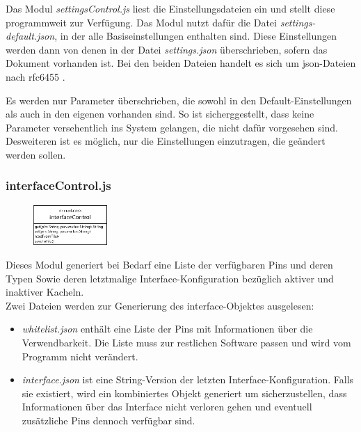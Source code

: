 Das Modul \textit{settingsControl.js} liest die Einstellungsdateien ein und stellt diese programmweit zur Verfügung. Das Modul nutzt dafür die Datei \textit{settings-default.json}, in der alle Basiseinstellungen enthalten sind. Diese Einstellungen werden dann von denen in der Datei \textit{settings.json} überschrieben, sofern das Dokument vorhanden ist. Bei den beiden Dateien handelt es sich um \gls{json}-Dateien nach rfc6455 \cite{rfc6455}.

Es werden nur Parameter überschrieben, die sowohl in den Default-Einstellungen als auch in den eigenen vorhanden sind. So ist sicherggestellt, dass keine Parameter versehentlich ins System gelangen, die nicht dafür vorgesehen sind. Desweiteren ist es möglich, nur die Einstellungen einzutragen, die geändert werden sollen.

\subsubsection{interfaceControl.js}
\begin{figure}
  \vspace{-18pt}
  \centering
  \includegraphics[width = 0.25\textwidth]{documentation/images/apiInterfaceControl.eps}
\end{figure}

Dieses Modul generiert bei Bedarf eine Liste der verfügbaren Pins und deren Typen Sowie deren letztmalige Interface-Konfiguration bezüglich aktiver und inaktiver Kacheln.\\

\noindent Zwei Dateien werden zur Generierung des interface-Objektes ausgelesen:

\begin{itemize}
  \item \textit{whitelist.json} enthält eine Liste der Pins mit Informationen über die Verwendbarkeit. Die Liste muss zur restlichen Software passen und wird vom Programm nicht verändert.
  \item \textit{interface.json} ist eine String-Version der letzten Interface-Konfiguration. Falls sie existiert, wird ein kombiniertes Objekt generiert um sicherzustellen, dass Informationen über das Interface nicht verloren gehen und eventuell zusätzliche Pins dennoch verfügbar sind.
\end{itemize}

